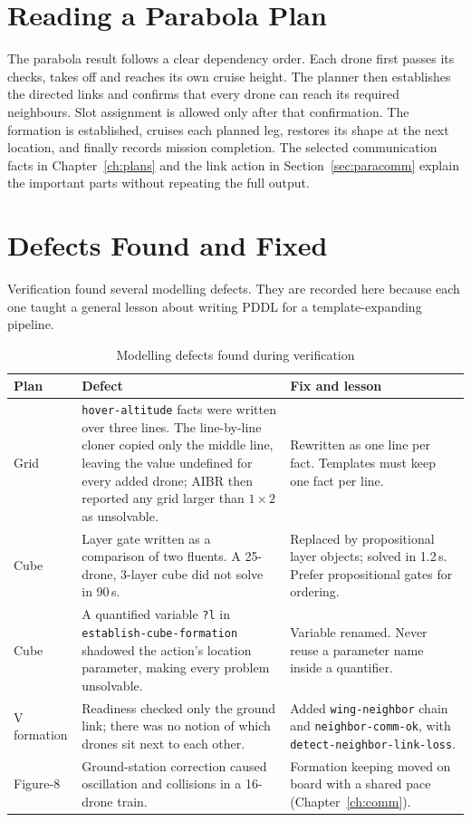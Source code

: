 \documentclass[11pt,a4paper,oneside]{report}
\newcommand{\code}[1]{\texttt{#1}}
\begin{document}
\section{Reading a Parabola Plan}\label{sec:sampleplan}
The parabola result follows a clear dependency order. Each drone first passes
its checks, takes off and reaches its own cruise height. The planner then
establishes the directed links and confirms that every drone can reach its
required neighbours. Slot assignment is allowed only after that confirmation.
The formation is established, cruises each planned leg, restores its shape at
the next location, and finally records mission completion. The selected
communication facts in Chapter~\ref{ch:plans} and the link action in
Section~\ref{sec:paracomm} explain the important parts without repeating the full output.

\section{Defects Found and Fixed}\label{sec:defects}
Verification found several modelling defects. They are recorded here because each one taught a
general lesson about writing PDDL for a template-expanding pipeline.

\begin{table}[H]
\caption[Modelling fixes]{Modelling defects found during verification}\label{tab:defects}
\small
\begin{tabularx}{\textwidth}{@{}P{0.2\textwidth}P{0.36\textwidth}Y@{}}
\toprule
\textbf{Plan} & \textbf{Defect} & \textbf{Fix and lesson} \\
\midrule
Grid & \code{hover-altitude} facts were written over three lines. The line-by-line cloner copied
only the middle line, leaving the value undefined for every added drone; AIBR then reported any
grid larger than $1\times2$ as unsolvable. & Rewritten as one line per fact. Templates must keep
one fact per line. \\
Cube & Layer gate written as a comparison of two fluents. A 25-drone, 3-layer cube did not solve
in 90\,s. & Replaced by propositional layer objects; solved in 1.2\,s. Prefer propositional
gates for ordering. \\
Cube & A quantified variable \code{?l} in \code{establish-cube-formation} shadowed the action's
location parameter, making every problem unsolvable. & Variable renamed. Never reuse a parameter
name inside a quantifier. \\
V formation & Readiness checked only the ground link; there was no notion of which drones sit
next to each other. & Added \code{wing-neighbor} chain and \code{neighbor-comm-ok}, with
\code{detect-neighbor-link-loss}. \\
Figure-8 & Ground-station correction caused oscillation and collisions in a 16-drone train. &
Formation keeping moved on board with a shared pace (Chapter~\ref{ch:comm}). \\
\bottomrule
\end{tabularx}
\end{table}
\end{document}
